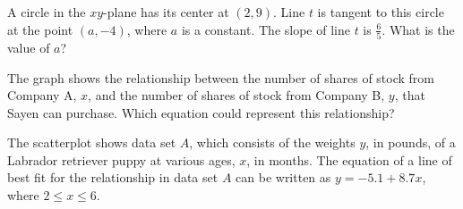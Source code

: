 \vspace{0.75em}


\vspace{2em}
\newpage

\noindent\markforreview
\vspace{1em}

A circle in the $xy$-plane has its center at $(2, 9)$.  
Line $t$ is tangent to this circle at the point $(a, -4)$, where $a$ is a constant.  
The slope of line $t$ is $\frac{6}{5}$.  
What is the value of $a$?

\vspace{0.75em}


\vspace{2em}
\newpage

\noindent\markforreview
\vspace{1em}

\begin{center}
\end{center}

The graph shows the relationship between the number of shares of stock from Company A, $x$,  
and the number of shares of stock from Company B, $y$, that Sayen can purchase.  
Which equation could represent this relationship?

\vspace{0.75em}


\vspace{2em}
\newpage

\noindent\markforreview
\vspace{1em}

The scatterplot shows data set $A$, which consists of the weights $y$, in pounds,  
of a Labrador retriever puppy at various ages, $x$, in months.  
The equation of a line of best fit for the relationship in data set $A$ can be written as  
$y = -5.1 + 8.7x$, where $2 \leq x \leq 6$.





